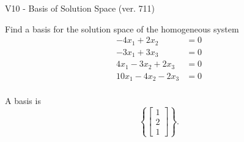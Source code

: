 \begin{exercise}
  \begin{exerciseTitle}V10 - Basis of Solution Space (ver. 711)\end{exerciseTitle}
  \begin{exerciseStatement}
    Find a basis for the solution space of the homogeneous system 
\begin{align*}
 -4 x_ 1 + 2 x_ 2 &= 0  \\ 
  -3 x_ 1 + 3 x_ 3 &= 0  \\ 
  4 x_ 1 -3 x_ 2 + 2 x_ 3 &= 0  \\ 
  10 x_ 1 -4 x_ 2 -2 x_ 3 &= 0  \\ 
 \end{align*}


 
  \end{exerciseStatement}

  \begin{exerciseAnswer}
   A basis is   
\[\left\{\left[\begin{array}{c}
1 \\
2 \\
1
\end{array}\right]\right\}.\]

  


  \end{exerciseAnswer}
\end{exercise}